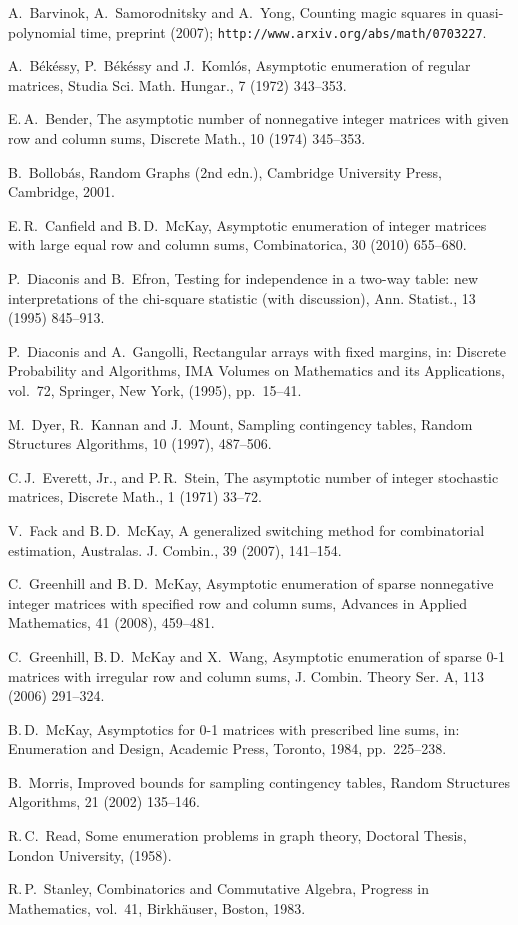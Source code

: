\documentclass[12pt]{article}
\numberwithin{equation}{section}
\begin{document}
\begin{thebibliography}{999}

 A.~Barvinok, A.~Samorodnitsky and A.~Yong,
 Counting magic squares in quasi-polynomial time, preprint (2007);
 \texttt{http://www.arxiv.org/abs/math/0703227}.

 A.~B\'ek\'essy, P.~B\'ek\'essy and J.~Koml\'os,
  Asymptotic enumeration of regular matrices,
  Studia Sci. Math. Hungar., 7 (1972) 343--353.

 E.\,A.~Bender,
  The asymptotic number of nonnegative integer matrices with given row
  and column sums, Discrete Math., 10 (1974) 345--353.

B.~Bollob\'as, Random Graphs (2nd edn.), 
Cambridge University Press, Cambridge, 2001.

 E.\,R.~Canfield and B.\,D.~McKay,
Asymptotic enumeration of integer
matrices with large equal row and column sums,
Combinatorica, 30 (2010) 655--680.

P.~Diaconis and B.~Efron, 
Testing for independence in a two-way table: new interpretations
of the chi-square statistic (with discussion), 
Ann. Statist., 13 (1995) 845--913.

 P.~Diaconis and A.~Gangolli,
  Rectangular arrays with fixed margins, 
in:
Discrete Probability and Algorithms,
IMA Volumes on Mathematics and its Applications, 
vol.~72, Springer, New York, (1995),
pp.~15--41.

 M.~Dyer, R.~Kannan and J.~Mount,
Sampling contingency tables, Random Structures Algorithms,
10 (1997), 487--506.

 C.\,J.~Everett, Jr., and P.\,R.~Stein,
  The asymptotic number of integer stochastic matrices,
   Discrete Math., 1 (1971) 33--72.

V.~Fack and B.\,D.~McKay,
A generalized switching method for combinatorial estimation,
Australas. J. Combin., 39 (2007), 141--154.

C.~Greenhill and B.\,D.~McKay,
Asymptotic enumeration of sparse nonnegative integer matrices
with specified row and column sums,
Advances in Applied Mathematics, 41 (2008), 459--481.

 C.~Greenhill, B.\,D.~McKay and X.~Wang,
 Asymptotic enumeration of sparse \mbox{0-1} matrices with
irregular row and column sums,
 J. Combin. Theory Ser. A, 113 (2006) 291--324.

 B.\,D.~McKay,
Asymptotics for 0-1 matrices with prescribed line sums,
in: Enumeration and Design, Academic Press,
Toronto, 1984, pp.~225--238.

 B.~Morris,
 Improved bounds for sampling contingency tables,
 Random Structures Algorithms, 21 (2002)
 135--146.

 R.\,C.~Read,
  Some enumeration problems in graph theory,
  Doctoral Thesis, London University, (1958).

 R.\,P.~Stanley,
Combinatorics and Commutative Algebra, 
Progress in Mathematics, vol.~41, 
Birkh\"auser, Boston, 1983.

\end{thebibliography}
\end{document}
